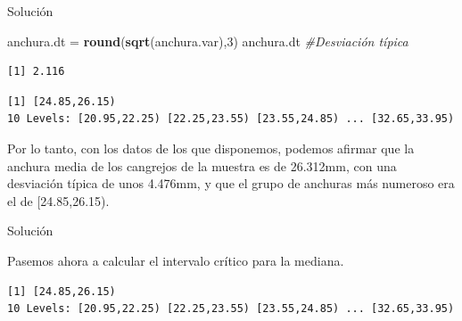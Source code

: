 \documentclass[
  ignorenonframetext,
]{beamer}
\newenvironment{Shaded}{\begin{snugshade}}{\end{snugshade}}
\newcommand{\CommentTok}[1]{\textcolor[rgb]{0.56,0.35,0.01}{\textit{#1}}}
\newcommand{\DecValTok}[1]{\textcolor[rgb]{0.00,0.00,0.81}{#1}}
\newcommand{\FloatTok}[1]{\textcolor[rgb]{0.00,0.00,0.81}{#1}}
\newcommand{\KeywordTok}[1]{\textcolor[rgb]{0.13,0.29,0.53}{\textbf{#1}}}
\newcommand{\NormalTok}[1]{#1}
\newcommand{\OperatorTok}[1]{\textcolor[rgb]{0.81,0.36,0.00}{\textbf{#1}}}
\newcommand{\StringTok}[1]{\textcolor[rgb]{0.31,0.60,0.02}{#1}}
\begin{document}
\begin{frame}[fragile]{Solución}
\protect\hypertarget{soluciuxf3n-32}{}

\begin{Shaded}
\begin{Highlighting}[]
\NormalTok{anchura.dt =}\StringTok{ }\KeywordTok{round}\NormalTok{(}\KeywordTok{sqrt}\NormalTok{(anchura.var),}\DecValTok{3}\NormalTok{)}
\NormalTok{anchura.dt }\CommentTok{#Desviación típica}
\end{Highlighting}
\end{Shaded}

\begin{verbatim}
[1] 2.116
\end{verbatim}

\begin{Shaded}
\end{Shaded}

\begin{verbatim}
[1] [24.85,26.15)
10 Levels: [20.95,22.25) [22.25,23.55) [23.55,24.85) ... [32.65,33.95)
\end{verbatim}

Por lo tanto, con los datos de los que disponemos, podemos afirmar que
la anchura media de los cangrejos de la muestra es de 26.312mm, con una
desviación típica de unos 4.476mm, y que el grupo de anchuras más
numeroso era el de {[}24.85,26.15).

\end{frame}

\begin{frame}[fragile]{Solución}
\protect\hypertarget{soluciuxf3n-33}{}

Pasemos ahora a calcular el intervalo crítico para la mediana.

\begin{Shaded}
\end{Shaded}

\begin{verbatim}
[1] [24.85,26.15)
10 Levels: [20.95,22.25) [22.25,23.55) [23.55,24.85) ... [32.65,33.95)
\end{verbatim}

\end{frame}
\end{document}
